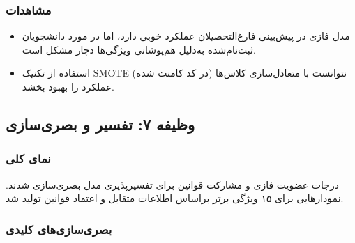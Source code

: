 \subsubsection{مشاهدات}

\begin{itemize}
	\item مدل فازی در پیش‌بینی فارغ‌التحصیلان عملکرد خوبی دارد، اما در مورد دانشجویان ثبت‌نام‌شده به‌دلیل هم‌پوشانی ویژگی‌ها دچار مشکل است.
	
	\item استفاده از تکنیک‌ SMOTE (در کد کامنت شده) نتوانست با متعادل‌سازی کلاس‌ها عملکرد را بهبود بخشد.
\end{itemize}


\subsection{وظیفه ۷: تفسیر و بصری‌سازی}

\subsubsection{نمای کلی}

درجات عضویت فازی و مشارکت قوانین برای تفسیرپذیری مدل بصری‌سازی شدند. نمودارهایی برای ۱۵ ویژگی برتر براساس اطلاعات متقابل و اعتماد قوانین تولید شد.

\subsubsection{بصری‌سازی‌های کلیدی}


